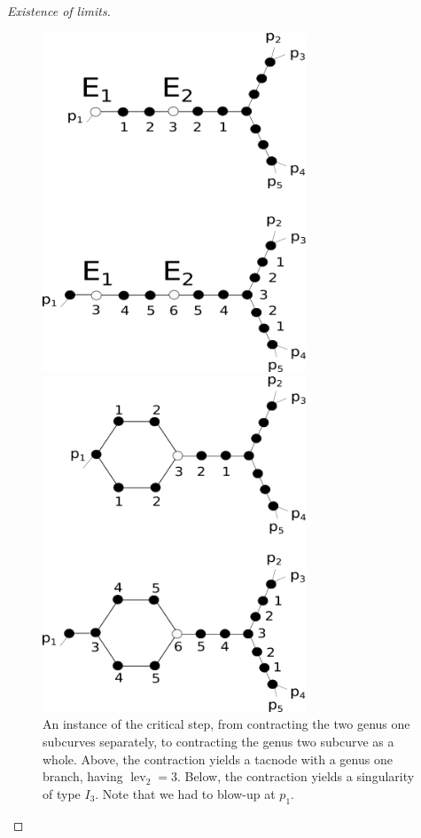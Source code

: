 \documentclass{compositio}
\newcommand{\lev}{\operatorname{lev}}
\theoremstyle{plain}
\theoremstyle{definition}
\theoremstyle{remark}
\begin{document}
\begin{proof}[Existence of limits]
 \begin{figure}[h!bt]
    \centering
    \begin{minipage}[b]{0.45\textwidth}
        \centering
        \includegraphics[width=0.7\textwidth]{critical_step_v} %
        \caption{An instance of the critical step, from contracting the two genus one subcurves separately, to contracting the genus two subcurve as a whole. Above, the contraction yields a tacnode with a genus one branch, having $\lev_2=3$. Below, the contraction yields a singularity of type $I_3$. Note that we had to blow-up at $p_1$.}\label{fig:critical}
    \end{minipage}\hfill
    \begin{minipage}[b]{0.45\textwidth}
        \centering
        \includegraphics[width=0.7\textwidth]{critical_step_ER_v} %

\end{minipage}
\end{figure}
\end{proof}
\end{document}
